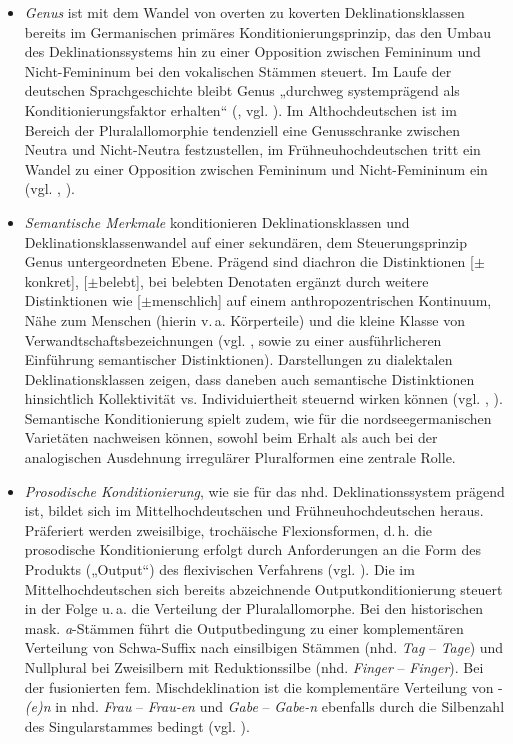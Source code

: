 \begin{itemize}\sloppy
\item \textit{Genus} ist mit dem Wandel von overten zu koverten Deklinationsklassen bereits im Germanischen primäres Konditionierungsprinzip, das den Umbau des Deklinationssystems hin zu einer Opposition zwischen Femininum und Nicht-Femininum bei den vokalischen Stämmen steuert. Im Laufe der deutschen Sprachgeschichte bleibt Genus „durchweg systemprägend als Konditionierungsfaktor erhalten“ (\citealt[142]{Kürschner2008a}, vgl. \citealt{Duke2005}). Im Althochdeutschen ist im Bereich der Pluralallomorphie tendenziell eine Genusschranke zwischen Neutra und Nicht-Neutra festzustellen, im Frühneuhochdeutschen tritt ein Wandel zu einer Opposition zwischen Femininum und Nicht-Femininum ein (vgl. \citealt[97--100 und 108--116]{Kürschner2008a}, \citealt[159--165]{Nübling2016}).
\item \textit{Semantische Merkmale} konditionieren Deklinationsklassen und Deklinationsklassenwandel auf einer sekundären, dem Steuerungsprinzip Genus untergeordneten Ebene. Prägend sind diachron die Distinktionen [${\pm}$konkret], [${\pm}$belebt], bei belebten Denotaten ergänzt durch weitere Distinktionen wie [${\pm}$menschlich] auf einem anthropozentrischen Kontinuum, Nähe zum Menschen (hierin v.\,a. Körperteile) und die kleine Klasse von Verwandtschaftsbezeichnungen (vgl. \citealt{Köpcke1994, Köpcke2000a}, \citealt[100--104 und 116--122]{Kürschner2008a} sowie  zu einer ausführlicheren Einführung semantischer Distinktionen). Darstellungen zu dialektalen Deklinationsklassen zeigen, dass daneben auch semantische Distinktionen hinsichtlich Kollektivität vs. Individuiertheit steuernd wirken können (vgl. \citealt[170]{Rowley1997}, \citealt[442--443]{Schirmunski1962}). Semantische Konditionierung spielt zudem, wie \citet[49--50]{VerslootAdamczyk2018} für die nordseegermanischen Varietäten nachweisen können, sowohl beim Erhalt als auch bei der analogischen Ausdehnung irregulärer Pluralformen eine zentrale Rolle.
\item \textit{Prosodische Konditionierung}, wie sie für das nhd. Deklinationssystem prägend ist, bildet sich im Mittelhochdeutschen und Frühneuhochdeutschen heraus. Präferiert werden zweisilbige, trochäische Flexionsformen, d.\,h. die prosodische Konditionierung erfolgt durch Anforderungen an die Form des Produkts („Output“) des flexivischen Verfahrens (vgl. \citealt[123--130]{Kürschner2008a}). Die im Mittelhochdeutschen sich bereits abzeichnende Outputkonditionierung steuert in der Folge u.\,a. die Verteilung der Pluralallomorphe. Bei den historischen mask. \textit{a}{}-Stämmen führt die Outputbedingung zu einer komplementären Verteilung von Schwa-Suffix nach einsilbigen Stämmen (nhd. \textit{Tag} -- \textit{Tage}) und Nullplural bei Zweisilbern mit Reduktionssilbe (nhd. \textit{Finger} -- \textit{Finger}). Bei der fusionierten fem. Mischdeklination ist die komplementäre Verteilung von -\textit{(e)n} in nhd. \textit{Frau} -- \textit{Frau-en} und \textit{Gabe} -- \textit{Gabe-n} ebenfalls durch die Silbenzahl des Singularstammes bedingt (vgl. ).

\end{itemize}
